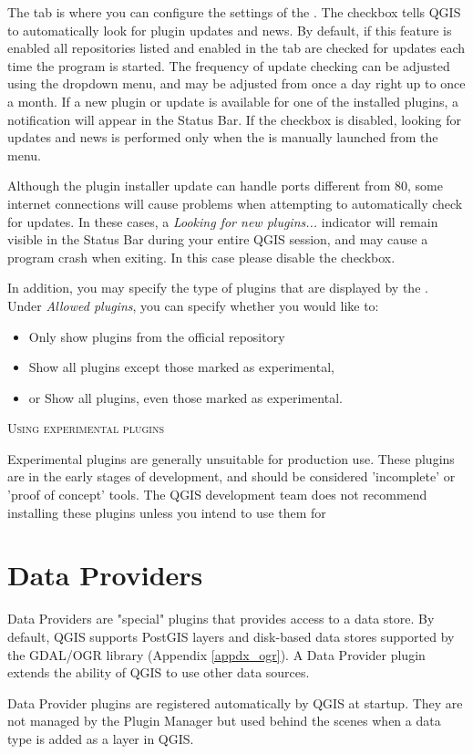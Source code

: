 
The  tab is where you can configure the settings of the . The  checkbox tells QGIS to automatically look for plugin updates and news. By default, if this feature is enabled all repositories listed and enabled in the  tab are checked for updates each time the program is started. The frequency of update checking can be adjusted using the dropdown menu, and may be adjusted from once a day right up to once a month. If a new plugin or update is available for one of the installed plugins, a notification will appear in the Status Bar. If the checkbox is disabled, looking for updates and news is performed only when the  is manually launched from the menu.

Although the plugin installer update can handle ports different from 80, some internet 
connections will cause problems when attempting to automatically check for updates. 
In these cases, a \textit{Looking for new plugins...} indicator will 
remain visible in the Status Bar during your entire QGIS session, and may cause a 
program crash when exiting. In this case please disable the checkbox.

In addition, you may specify the type of plugins that are displayed by the . Under \textit{Allowed plugins}, you can specify whether you would like to:

\begin{itemize}[label=--]
\item Only show plugins from the official repository
\item Show all plugins except those marked as experimental,
\item or Show all plugins, even those marked as experimental.
\end{itemize}

\begin{Tip}
 \caption{\textsc{Using experimental plugins}}
Experimental plugins are generally unsuitable for production use. These plugins are in the early stages of development, and should be considered 'incomplete' or 'proof of concept' tools. The QGIS development team does not recommend installing these plugins unless you intend to use them for 
\end{Tip}

\section{Data Providers}

Data Providers are "special" plugins that provides access to a data store.
By default, QGIS supports PostGIS layers and disk-based data stores supported by the GDAL/OGR library (Appendix \ref{appdx_ogr}).
A Data Provider plugin extends the ability of QGIS to use other data sources.

Data Provider plugins are registered automatically by QGIS at startup.
They are not managed by the Plugin Manager but used behind the scenes when a data type is added as a layer in QGIS.

\FloatBarrier
